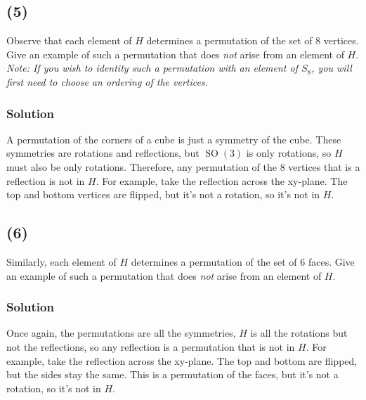 \documentclass[fleqn]{article}
\DeclareMathOperator{\SO}{SO}
\begin{document}
        \subsection{(5)}
        Observe that each element of $H$ determines a permutation of the set of 8 vertices.  Give an example of such a permutation that does \textit{not} arise from an element of $H$.  \textit{Note: If you wish to identity such a permutation with an element of $S_8$, you will first need to choose an ordering of the vertices.}
            
            \subsubsection{Solution}
            A permutation of the corners of a cube is just a symmetry of the cube.  These symmetries are rotations and reflections, but $\SO(3)$ is only rotations, so $H$ must also be only rotations.  Therefore, any permutation of the 8 vertices that is a reflection is not in $H$.  For example, take the reflection across the xy-plane.  The top and bottom vertices are flipped, but it's not a rotation, so it's not in $H$.
        
        \subsection{(6)}
        Similarly, each element of $H$ determines a permutation of the set of 6 faces.  Give an example of such a permutation that does \textit{not} arise from an element of $H$.
            
            \subsubsection{Solution}
            Once again, the permutations are all the symmetries, $H$ is all the rotations but not the reflections, so any reflection is a permutation that is not in $H$.  For example, take the reflection across the xy-plane.  The top and bottom are flipped, but the sides stay the same.  This is a permutation of the faces, but it's not a rotation, so it's not in $H$.
        
        
\end{document}
